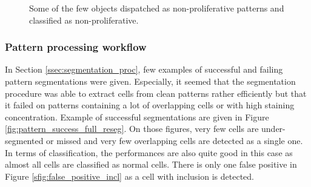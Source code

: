 \begin{figure}
	\caption{Some of the few objects dispatched as non-proliferative patterns and classified as non-proliferative.}
	\label{fig:pattern_ex_non_prolif}
\end{figure}

\subsubsection{Pattern processing workflow}
\label{ssec:detect_pattern_processing}
In Section \ref{ssec:segmentation_proc}, few examples of successful and failing pattern segmentations were given. Especially, it seemed that the segmentation procedure was able to extract cells from clean patterns rather efficiently but that it failed on patterns containing a lot of overlapping cells or with high staining concentration. Example of successful segmentations are given in Figure \ref{fig:pattern_success_full_reseg}. On those figures, very few cells are under-segmented or missed and very few overlapping cells are detected as a single one. In terms of classification, the performances are also quite good in this case as almost all cells are classified as normal cells. There is only one false positive in Figure \ref{sfig:false_positive_incl} as a cell with inclusion is detected. 


